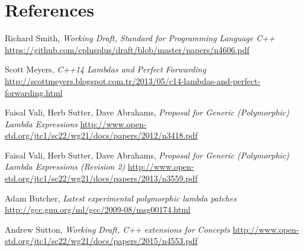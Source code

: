 \documentclass{wg21}
\begin{document}
\section{References}
\renewcommand{\section}[2]{}%
\begin{thebibliography}{9}

    Richard Smith,
    \emph{Working Draft, Standard for Programming Language C++}\newline
    \url{https://github.com/cplusplus/draft/blob/master/papers/n4606.pdf}

    Scott Meyers,
    \emph{C++14 Lambdas and Perfect Forwarding}\newline
    \url{http://scottmeyers.blogspot.com.tr/2013/05/c14-lambdas-and-perfect-forwarding.html}

    Faisal Vali, Herb Sutter, Dave Abrahams,
    \emph{Proposal for Generic (Polymorphic) Lambda Expressions}\newline
    \url{http://www.open-std.org/jtc1/sc22/wg21/docs/papers/2012/n3418.pdf}

    Faisal Vali, Herb Sutter, Dave Abrahams,
    \emph{Proposal for Generic (Polymorphic) Lambda Expressions (Revision 2)}\newline
    \url{http://www.open-std.org/jtc1/sc22/wg21/docs/papers/2013/n3559.pdf}

    Adam Butcher,
    \emph{Latest experimental polymorphic lambda patches}\newline
    \url{http://gcc.gnu.org/ml/gcc/2009-08/msg00174.html}

    Andrew Sutton,
    \emph{Working Draft, C++ extensions for Concepts}\newline
    \url{http://www.open-std.org/jtc1/sc22/wg21/docs/papers/2015/n4553.pdf}

\end{thebibliography}
\end{document}
